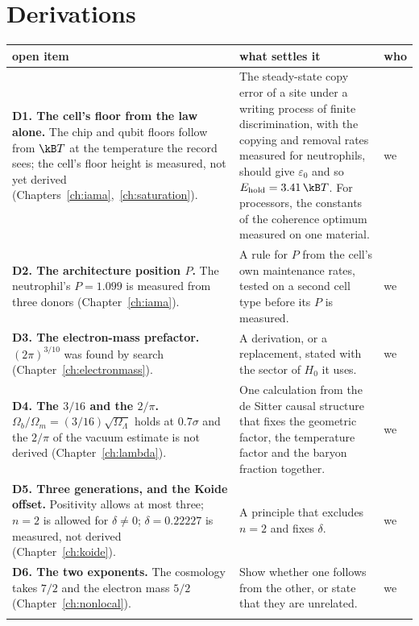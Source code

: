 \section{Derivations}
{\small\begin{longtable}{@{}>{\raggedright\arraybackslash}p{}>{\raggedright\arraybackslash}p{}>{\raggedright\arraybackslash}p{}@{}}
\toprule
open item & what settles it & who \\\midrule\endhead
\textbf{D1. The cell's floor from the law alone.} The chip and qubit floors follow from $\kB T$ at the temperature the record sees; the
 cell's floor height is measured, not yet derived (Chapters~\ref{ch:iama},~\ref{ch:saturation}).
 & The steady-state copy error of a site under a writing process of finite discrimination, with the copying and removal rates
   measured for neutrophils, should give $\varepsilon_0$ and so $E_{\rm hold}=3.41\,\kB T$. For processors, the constants of the coherence
   optimum measured on one material.
 & we \\\cmidrule[0.2pt]{1-3}
\textbf{D2. The architecture position $P$.} The neutrophil's $P=1.099$ is measured from three donors (Chapter~\ref{ch:iama}).
 & A rule for $P$ from the cell's own maintenance rates, tested on a second cell type before its $P$ is measured. & we \\\cmidrule[0.2pt]{1-3}
\textbf{D3. The electron-mass prefactor.} $(2\pi)^{3/10}$ was found by search (Chapter~\ref{ch:electronmass}).
 & A derivation, or a replacement, stated with the sector of $H_0$ it uses. & we \\\cmidrule[0.2pt]{1-3}
\textbf{D4. The $3/16$ and the $2/\pi$.} $\Omega_b/\Omega_m=(3/16)\sqrt{\Omega_\Lambda}$ holds at $0.7\sigma$ and the $2/\pi$ of the
 vacuum estimate is not derived (Chapter~\ref{ch:lambda}).
 & One calculation from the de Sitter causal structure that fixes the geometric factor, the temperature factor and the baryon fraction together. & we \\\cmidrule[0.2pt]{1-3}
\textbf{D5. Three generations, and the Koide offset.} Positivity allows at most three; $n=2$ is allowed for $\delta\ne0$; $\delta=0.22227$ is
 measured, not derived (Chapter~\ref{ch:koide}). & A principle that excludes $n=2$ and fixes $\delta$. & we \\\cmidrule[0.2pt]{1-3}
\textbf{D6. The two exponents.} The cosmology takes $7/2$ and the electron mass $5/2$ (Chapter~\ref{ch:nonlocal}).
 & Show whether one follows from the other, or state that they are unrelated. & we \\\cmidrule[0.2pt]{1-3}

\end{longtable}}

